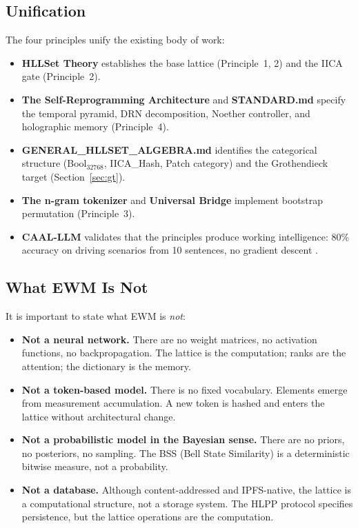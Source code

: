 \documentclass[11pt,a4paper]{article}
\theoremstyle{remark}
\begin{document}
\subsection{Unification}

The four principles unify the existing body of work:

\begin{itemize}[leftmargin=*,nosep]
  \item \textbf{HLLSet Theory} \cite{astesj2026} establishes the base lattice
    (Principle~1, 2) and the IICA gate (Principle~2).
  \item \textbf{The Self-Reprogramming Architecture} and \textbf{STANDARD.md} specify
    the temporal pyramid, DRN decomposition, Noether controller, and holographic memory
    (Principle~4).
  \item \textbf{GENERAL\_HLLSET\_ALGEBRA.md} identifies the categorical structure
    (Bool$_{32768}$, IICA\_Hash, Patch category) and the Grothendieck target
    (Section~\ref{sec:gt}).
  \item \textbf{The n-gram tokenizer} and \textbf{Universal Bridge} implement
    bootstrap permutation (Principle~3).
  \item \textbf{CAAL-LLM} validates that the principles produce working intelligence:
    80\% accuracy on driving scenarios from 10 sentences, no gradient descent
    \cite{astesj2026}.
\end{itemize}

\subsection{What EWM Is Not}

It is important to state what EWM is \textit{not}:

\begin{itemize}[leftmargin=*,nosep]
  \item \textbf{Not a neural network.} There are no weight matrices, no activation
    functions, no backpropagation. The lattice is the computation; ranks are the
    attention; the dictionary is the memory.
  \item \textbf{Not a token-based model.} There is no fixed vocabulary. Elements emerge
    from measurement accumulation. A new token is hashed and enters the lattice without
    architectural change.
  \item \textbf{Not a probabilistic model in the Bayesian sense.} There are no
    priors, no posteriors, no sampling. The BSS (Bell State Similarity) is a
    deterministic bitwise measure, not a probability.
  \item \textbf{Not a database.} Although content-addressed and IPFS-native, the
    lattice is a computational structure, not a storage system. The HLPP protocol
    specifies persistence, but the lattice operations are the computation.
\end{itemize}
\end{document}

